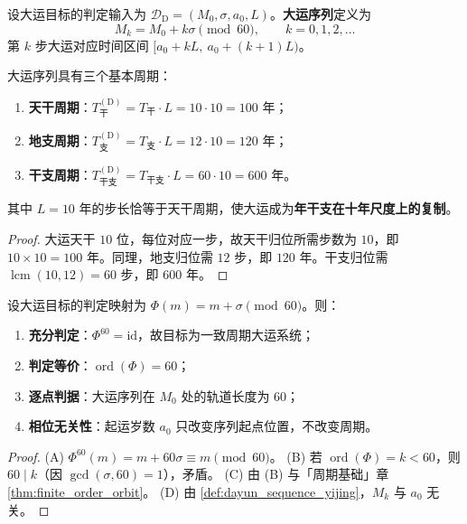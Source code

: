 \begin{definition}[大运序列]\label{def:dayun_sequence_yijing}
设大运目标的判定输入为 $\mathcal D_{\mathrm{D}}=(M_0,\sigma,a_0,L)$。\textbf{大运序列}定义为
\[
M_k=M_0+k\sigma\pmod{60},\qquad k=0,1,2,\dots
\]
第 $k$ 步大运对应时间区间 $[a_0+kL,\ a_0+(k+1)L)$。
\end{definition}

\begin{theorem}[大运的三个基本周期]\label{thm:dayun_three_periods_yijing}
大运序列具有三个基本周期：
\begin{enumerate}[label=(\roman*)]
    \item \textbf{天干周期}：$T_{\text{干}}^{\mathrm{(D)}}=T_{\text{干}}\cdot L=10\cdot 10=100$ 年；
    \item \textbf{地支周期}：$T_{\text{支}}^{\mathrm{(D)}}=T_{\text{支}}\cdot L=12\cdot 10=120$ 年；
    \item \textbf{干支周期}：$T_{\text{干支}}^{\mathrm{(D)}}=T_{\text{干支}}\cdot L=60\cdot 10=600$ 年。
\end{enumerate}
其中 $L=10$ 年的步长恰等于天干周期，使大运成为\textbf{年干支在十年尺度上的复制}。
\end{theorem}

\begin{proof}
大运天干 $10$ 位，每位对应一步，故天干归位所需步数为 $10$，即 $10\times 10=100$ 年。同理，地支归位需 $12$ 步，即 $120$ 年。干支归位需 $\operatorname{lcm}(10,12)=60$ 步，即 $600$ 年。
\end{proof}

\begin{proposition}[大运周期性判定定理]\label{thm:dayun_periodicity_decision_yijing}
设大运目标的判定映射为 $\Phi(m)=m+\sigma\pmod{60}$。则：
\begin{enumerate}[label=(\Alph*)]
    \item \textbf{充分判定}：$\Phi^{60}=\mathrm{id}$，故目标为一致周期大运系统；
    \item \textbf{判定等价}：$\operatorname{ord}(\Phi)=60$；
    \item \textbf{逐点判据}：大运序列在 $M_0$ 处的轨道长度为 $60$；
    \item \textbf{相位无关性}：起运岁数 $a_0$ 只改变序列起点位置，不改变周期。
\end{enumerate}
\end{proposition}

\begin{proof}
(A) $\Phi^{60}(m)=m+60\sigma\equiv m\pmod{60}$。
(B) 若 $\operatorname{ord}(\Phi)=k<60$，则 $60\mid k$（因 $\gcd(\sigma,60)=1$），矛盾。
(C) 由 (B) 与「周期基础」章 \cref{thm:finite_order_orbit}。
(D) 由 \cref{def:dayun_sequence_yijing}，$M_k$ 与 $a_0$ 无关。
\end{proof}

